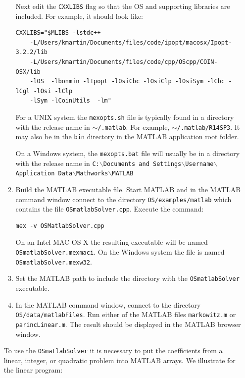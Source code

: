 \documentclass[11pt]{article}
\renewcommand{\_}{{\char"5F}}
\renewcommand{\{}{{\char"7B}}
\renewcommand{\}}{{\char"7D}}
\renewcommand{\^}{{\char"0D}}
\renewcommand{\'}{{\char"0D}}
\begin{document}
\begin{enumerate}[Step 1:]
\begin{enumerate}[{\bf Step 1:}]
Next edit the {\tt CXXLIBS} flag so that the OS and supporting libraries are included. For example, it should look like:

\begin{verbatim}
CXXLIBS="$MLIBS -lstdc++
    -L/Users/kmartin/Documents/files/code/ipopt/macosx/Ipopt-3.2.2/lib
    -L/Users/kmartin/Documents/files/code/cpp/OScpp/COIN-OSX/lib
    -lOS  -lbonmin -lIpopt -lOsiCbc -lOsiClp -lOsiSym -lCbc -lCgl -lOsi -lClp
    -lSym -lCoinUtils  -lm"
\end{verbatim}

For a UNIX system the {\tt mexopts.sh} file  is typically  found in a directory with the release name in 
{\tt  $\sim$/.matlab}. For example, {\tt $\sim$/.matlab/R14SP3}.  It may also be in the {\tt bin} directory 
in the MATLAB application root folder.


On a Windows system, the {\tt  mexopts.bat} file will usually be in a directory with the release name in 
{\tt C:$\backslash$Documents and Settings$\backslash$Username$\backslash$Application Data$\backslash$Mathworks$\backslash$MATLAB}


\item{}  Build the MATLAB executable file. Start MATLAB and in the MATLAB command window connect to the directory {\tt OS/examples/matlab} which  contains the file {\tt OSmatlabSolver.cpp}.    Execute the command:

\begin{verbatim}
mex -v OSMatlabSolver.cpp
\end{verbatim}

On an Intel MAC OS X the resulting executable will be named {\tt OSmatlabSolver.mexmaci}. On the Windows system the file is named {\tt OSmatlabSolver.mexw32}.

\item{}  Set the MATLAB path to include the directory with the {\tt OSmatlabSolver} executable.


\item{}   In the MATLAB command window, connect to the directory {\tt OS/data/matlabFiles}. Run either of the MATLAB
files {\tt markowitz.m} or {\tt parincLinear.m}.  The result should be displayed in the MATLAB browser window.

\end{enumerate}


To use the {\tt OSmatlabSolver} it is necessary to put the coefficients  from a linear, integer, or quadratic problem into MATLAB arrays.   We illustrate for the linear program:


\end{enumerate}
\end{document}
